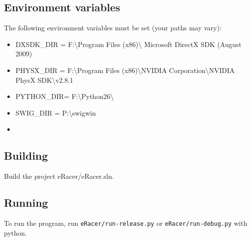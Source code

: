 \documentclass[11pt]{article}
\begin{document}
\subsection{Environment variables}

The following environment variables
must be set (your paths may vary):

\begin{itemize}
  \item DXSDK_DIR = F:\textbackslash Program Files (x86)\textbackslash
  Microsoft DirectX SDK (August 2009)
  \item PHYSX_DIR = F:\textbackslash Program Files (x86)\textbackslash NVIDIA
  Corporation\textbackslash NVIDIA PhysX SDK\textbackslash v2.8.1
  \item PYTHON_DIR= F:\textbackslash Python26\textbackslash
  \item SWIG_DIR  = P:\textbackslash swigwin\item 
\end{itemize}  
 
\subsection{Building}

Build the project eRacer/eRacer.sln.

\subsection{Running}  
  
To run the program, run \texttt{eRacer/run-release.py} or
\texttt{eRacer/run-debug.py} with python.
\end{document}
